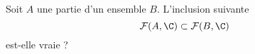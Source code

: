 Soit $A$ une partie d'un ensemble $B$. L'inclusion suivante
\begin{displaymath}
 \mathcal F(A,\C) \subset \mathcal F(B,\C) 
\end{displaymath}
est-elle vraie ? \bigskip